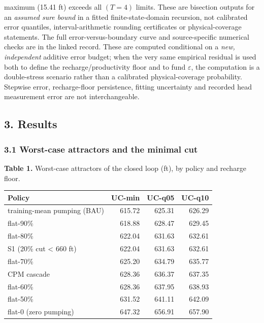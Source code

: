 \documentclass[11pt]{article}
\begin{document}
maximum (15.41 ft) exceeds all $(T=4)$ limits. These are bisection
outputs for an \emph{assumed sure bound} in a fitted finite-state-domain
recursion, not calibrated error quantiles, interval-arithmetic rounding
certificates or physical-coverage statements. The full error-versus-boundary
curve and source-specific numerical checks are in the linked record.
These are computed conditional on a
\emph{new, independent} additive error budget; when the very same
empirical residual is used both to define the recharge/productivity
floor and to fund $\varepsilon$, the computation is a double-stress
scenario rather than a calibrated physical-coverage probability.
Stepwise error, recharge-floor persistence, fitting uncertainty and
recorded head measurement error are not interchangeable.

\subsection{3. Results}\label{edw-results}

\subsubsection{3.1 Worst-case attractors and the minimal
cut}\label{edw-worst-case-attractors-and-the-minimal-cut}

\textbf{Table 1.} Worst-case attractors of the closed loop (ft), by
policy and recharge floor.

\begin{longtable}[]{@{}lrrr@{}}
\toprule\noalign{}
Policy & UC-min & UC-q05 & UC-q10 \\
\midrule\noalign{}
\endhead
\bottomrule\noalign{}
\endlastfoot
training-mean pumping (BAU) & 615.72 & 625.31 & 626.29 \\
flat-90\% & 618.88 & 628.47 & 629.45 \\
flat-80\% & 622.04 & 631.63 & 632.61 \\
S1 (20\% cut \textless{} 660 ft) & 622.04 & 631.63 & 632.61 \\
flat-70\% & 625.20 & 634.79 & 635.77 \\
CPM cascade & 628.36 & 636.37 & 637.35 \\
flat-60\% & 628.36 & 637.95 & 638.93 \\
flat-50\% & 631.52 & 641.11 & 642.09 \\
flat-0 (zero pumping) & 647.32 & 656.91 & 657.90 \\
\end{longtable}
\end{document}
